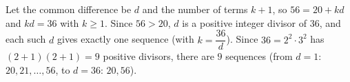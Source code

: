 Let the common difference be $d$ and the number of terms $k+1$, so $56=20+kd$ and $kd=36$ with $k\ge1$. Since $56>20$, $d$ is a positive integer divisor of $36$, and each such $d$ gives exactly one sequence (with $k=\dfrac{36}{d}$). Since $36=2^2\cdot3^2$ has $(2+1)(2+1)=9$ positive divisors, there are $\boxed{9}$ sequences (from $d=1$: $20,21,\dots,56$, to $d=36$: $20,56$).
